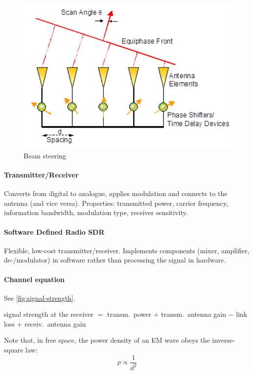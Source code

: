 \begin{figure}[h]
	\centering
	\includegraphics[scale=0.4]{images/1-beam-steering.png}
	\caption{Beam steering}%
	\label{fig:beam-steering}
\end{figure}

\paragraph{Transmitter/Receiver}
Converts from digital to analogue, applies modulation and connects to the antenna (and vice versa).
Properties: transmitted power, carrier frequency, information bandwidth, modulation type, receiver sensitivity.

\paragraph{Software Defined Radio SDR}
Flexible, low-cost transmitter/receiver. Implements components (mixer, amplifier, de-/modulator) in software rather than processing the signal in hardware.

\paragraph{Channel equation}
See \autoref{fig:signal-strength}.

signal strength at the receiver $=$ transm.\ power $+$ transm.\ antenna gain $-$ link loss $+$ receiv.\ antenna gain

Note that, in free space, the power density of an EM wave obeys the inverse-square law:
\[p \propto \frac{1}{d^2} \]

